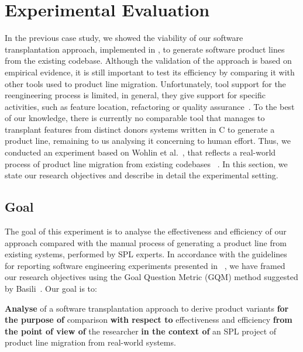 \section{Experimental Evaluation} \label{sec:evaluation}

In the previous case study, we showed the viability of our software transplantation approach, implemented in \autoscalpel, to generate software product lines from the existing codebase. Although the validation of the approach is based on empirical evidence, it  is  still important to test its efficiency by comparing it with other tools used to product line migration. Unfortunately, tool support for the reengineering process is limited, in general, they give support for specific activities, such as feature location, refactoring or quality assurance~\cite{Assuncao2017,Kruger2020}. To the best of our knowledge, there is currently no comparable tool that manages to transplant features from distinct donors systems written in C to generate a product line, remaining to us analysing it concerning to human effort. Thus, we conducted an experiment based on Wohlin et al.~\cite{Wohlin2012}, that reflects a real-world process of product line migration from existing codebases ~\cite{Krueger2002}. In this section, we state our research objectives and describe in detail the experimental setting.

\subsection{Goal}
The goal of this experiment is to analyse the effectiveness and efficiency of our approach compared with the manual process of generating a product line from existing systems, performed by SPL  experts. In accordance with the guidelines for reporting software engineering experiments presented in ~\cite{Wohlin2012b}, we have framed our research objectives using the Goal Question Metric (GQM) method suggested by Basili~\cite{Basili1994}. Our goal is to:

\textbf{Analyse} of a software transplantation approach to derive product variants 
\textbf{for the purpose of} comparison 
\textbf{with respect to} effectiveness and efficiency 
\textbf{from the point of view of} the researcher
\textbf{in the context of} an SPL project of product line migration from real-world systems.

